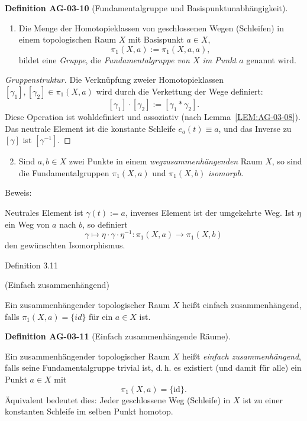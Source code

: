 \documentclass[10pt, letterpaper]{article}
\newcommand{\CustomHeading}[3]{%
  \par\medskip\noindent%
  \textbf{#1 #2} \textnormal{(#3)}.\enskip%
}
\newenvironment{DEF}[2]{\begin{unitbox}\CustomHeading{Definition}{#1}{#2}}{\end{unitbox}}
\begin{document}
\begin{DEF}{AG-03-10}{Fundamentalgruppe und Basispunktunabhängigkeit}
\begin{enumerate}
\item
Die Menge der Homotopieklassen von geschlossenen Wegen (Schleifen) 
in einem topologischen Raum \(X\) mit Basispunkt \(a\in X\),
\[
\pi_1(X,a):=\pi_1(X,a,a),
\]
bildet eine \emph{Gruppe}, die \emph{Fundamentalgruppe von \(X\) im Punkt \(a\)} genannt wird.
\end{enumerate}

\begin{proof}[Gruppenstruktur]
Die Verknüpfung zweier Homotopieklassen \([\gamma_1],[\gamma_2]\in\pi_1(X,a)\)
wird durch die Verkettung der Wege definiert:
\[
[\gamma_1]\cdot[\gamma_2]:=[\gamma_1 * \gamma_2].
\]
Diese Operation ist wohldefiniert und assoziativ (nach Lemma~\ref{LEM:AG-03-08}).  
Das neutrale Element ist die konstante Schleife \(e_a(t)\equiv a\),
und das Inverse zu \([\gamma]\) ist \([\gamma^{-1}]\). 
\end{proof}

\begin{enumerate}\setcounter{enumi}{1}
\item
Sind \(a,b\in X\) zwei Punkte in einem \emph{wegzusammenhängenden} Raum \(X\),
so sind die Fundamentalgruppen \(\pi_1(X,a)\) und \(\pi_1(X,b)\) \emph{isomorph}.
\end{enumerate}
\end{DEF}

Beweis: 

Neutrales Element ist $\gamma(t):=a$, inverses Element ist der umgekehrte Weg. Ist $\eta$ ein Weg von $a$ nach $b$, so definiert
$$
\gamma \mapsto \eta \cdot \gamma \cdot \eta^{-1}: \pi_{1}(X, a) \rightarrow \pi_{1}(X, b)
$$
den gewünschten Isomorphismus. 



Definition 3.11 

(Einfach zusammenhängend) 

Ein zusammenhängender topologischer Raum $X$ heißt einfach zusammenhängend, falls $\pi_{1}(X, a)=\{i d\}$ für ein $a \in X$ ist.

\begin{DEF}{AG-03-11}{Einfach zusammenhängende Räume}
Ein zusammenhängender topologischer Raum \(X\) heißt \emph{einfach zusammenhängend},  
falls seine Fundamentalgruppe trivial ist, d.\,h. es existiert (und damit für alle) ein Punkt \(a\in X\) mit
\[
\pi_1(X,a)=\{\mathrm{id}\}.
\]
Äquivalent bedeutet dies: Jeder geschlossene Weg (Schleife) in \(X\) ist zu einer konstanten Schleife im selben Punkt homotop.
\end{DEF}
\end{document}
